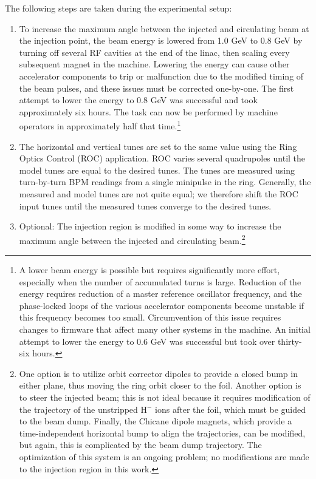 The following steps are taken during the experimental setup:
%
\begin{enumerate}
    \item 
    To increase the maximum angle between the injected and circulating beam at the injection point, the beam energy is lowered from 1.0 GeV to 0.8 GeV by turning off several RF cavities at the end of the linac, then scaling every subsequent magnet in the machine. Lowering the energy can cause other accelerator components to trip or malfunction due to the modified timing of the beam pulses, and these issues must be corrected one-by-one. The first attempt to lower the energy to 0.8 GeV was successful and took approximately six hours. The task can now be performed by machine operators in approximately half that time.\footnote{A lower beam energy is possible but requires significantly more effort, especially when the number of accumulated turns is large. Reduction of the energy requires reduction of a master reference oscillator frequency, and the phase-locked loops of the various accelerator components become unstable if this frequency becomes too small. Circumvention of this issue requires changes to firmware that affect many other systems in the machine. An initial attempt to lower the energy to 0.6 GeV was successful but took over thirty-six hours.}
    \item
    The horizontal and vertical tunes are set to the same value using the Ring Optics Control (ROC) application. ROC varies several quadrupoles until the model tunes are equal to the desired tunes. The tunes are measured using turn-by-turn BPM readings from a single minipulse in the ring. Generally, the measured and model tunes are not quite equal; we therefore shift the ROC input tunes until the measured tunes converge to the desired tunes. 
    \item
    Optional: The injection region is modified in some way to increase the maximum angle between the injected and circulating beam.\footnote{One option is to utilize orbit corrector dipoles to provide a closed bump in either plane, thus moving the ring orbit closer to the foil. Another option is to steer the injected beam; this is not ideal because it requires modification of the trajectory of the unstripped H$^-$ ions after the foil, which must be guided to the beam dump. Finally, the Chicane dipole magnets, which provide a time-independent horizontal bump to align the trajectories, can be modified, but again, this is complicated by the beam dump trajectory. The optimization of this system is an ongoing problem; no modifications are made to the injection region in this work.}

\end{enumerate}

